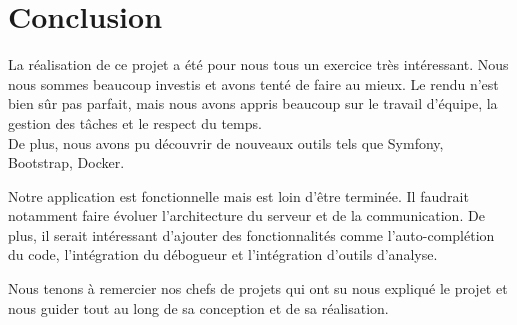 \chapter{Conclusion}

\par La réalisation de ce projet a été pour nous tous un exercice très intéressant. Nous nous sommes beaucoup investis et avons tenté de faire au mieux. Le rendu n'est bien sûr pas parfait, mais nous avons appris beaucoup sur le travail d'équipe, la gestion des tâches et le respect du temps.\\
De plus, nous avons pu découvrir de nouveaux outils tels que Symfony, Bootstrap, Docker. \\

\par Notre application est fonctionnelle mais est loin d'être terminée. Il faudrait notamment faire évoluer l'architecture du serveur et de la communication. De plus, il serait intéressant d'ajouter des fonctionnalités comme l'auto-complétion du code, l’intégration du débogueur et l'intégration d’outils d’analyse. \\

\par Nous tenons à remercier nos chefs de projets qui ont su nous expliqué le projet et nous guider tout au long de sa conception et de sa réalisation.